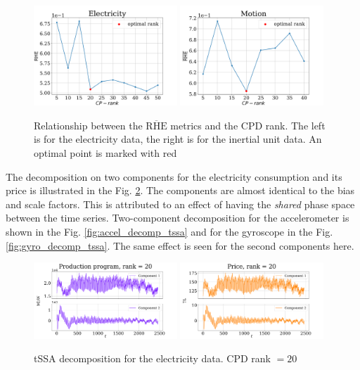 \documentclass[referee, pdflatex, sn-mathphys-num]{sn-jnl}
\theoremstyle{definition}
\theoremstyle{plain}
\begin{document}
	\begin{figure}[h]
		\centering
		\includegraphics[width=0.48\textwidth, keepaspectratio]{RHE_mean_elec.png}
		\includegraphics[width=0.48\textwidth, keepaspectratio]{RHE_mean_motion.png}
		\caption{Relationship between the $ \overline{\text{RHE}} $ metrics and the CPD rank. The left is for the electricity data, the right is for the inertial unit data. An optimal point is marked with red}\label{fig:decomp_rhe_rank}
	\end{figure}
	
	The decomposition on two components for the electricity consumption and its price is illustrated in the Fig. \ref{fig:electr_decomp_tssa}. The components are almost identical to the bias and scale factors. This is attributed to an effect of having the \emph{shared} phase space between the time series. Two-component decomposition for the accelerometer is shown in the Fig. \ref{fig:accel_decomp_tssa} and for the gyroscope in the Fig. \ref{fig:gyro_decomp_tssa}. The same effect is seen for the second components here.
	
	\begin{figure}[h]
		\centering
		\includegraphics[width=0.48\textwidth, keepaspectratio]{Production program_decomp.png}
		\includegraphics[width=0.48\textwidth, keepaspectratio]{Price_decomp.png}
		\caption{tSSA decomposition for the electricity data. CPD rank $ = 20 $}\label{fig:electr_decomp_tssa}
	\end{figure}
	
\end{document}
